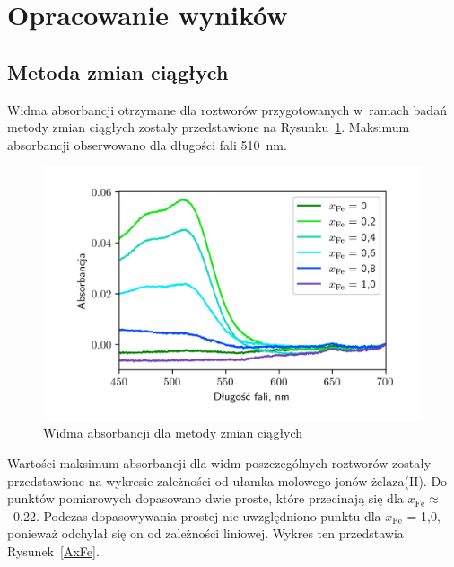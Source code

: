 \documentclass[12pt]{article}
\begin{document}
\section{Opracowanie wyników}

\subsection{Metoda zmian ciągłych}

Widma absorbancji otrzymane dla roztworów przygotowanych w~ramach badań metody zmian ciągłych zostały przedstawione na Rysunku~\ref{widma1}. Maksimum absorbancji obserwowano dla długości fali 510~nm.

\begin{figure}[H]
    \begin{center}
        \includegraphics{ChFizLab_R3_widma1.png}
    \end{center}
    \caption{Widma absorbancji dla metody zmian ciągłych}
    \label{widma1}
\end{figure}


\noindent Wartości maksimum absorbancji dla widm poszczególnych roztworów zostały przedstawione na wykresie zależności od ułamka molowego jonów żelaza(II). Do punktów pomiarowych dopasowano dwie proste, które przecinają się dla $x_{\mathrm{Fe}} \approx$~0,22. Podczas dopasowywania prostej nie uwzględniono punktu dla $x_{\mathrm{Fe}}$ = 1,0, ponieważ odchylał się on od zależności liniowej. Wykres ten przedstawia Rysunek~\ref{AxFe}.
\end{document}
